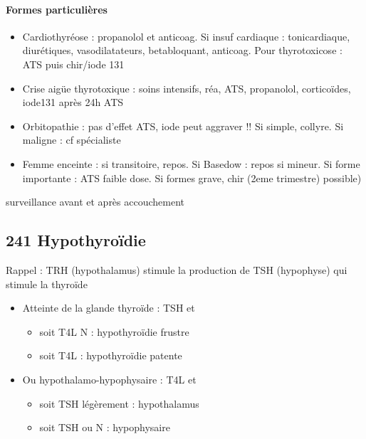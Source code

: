 \documentclass[11pt]{article}
\begin{document}
\paragraph{Formes particulières}
\label{sec:org398e54f}
\begin{itemize}
\item Cardiothyréose : propanolol et anticoag. Si insuf cardiaque : tonicardiaque,
diurétiques, vasodilatateurs, betabloquant, anticoag. Pour thyrotoxicose : ATS
puis chir/iode 131
\item Crise aigüe thyrotoxique : soins intensifs, réa, ATS, propanolol, corticoïdes,
iode131 après 24h ATS
\item Orbitopathie : pas d'effet ATS, iode peut aggraver !! Si simple, collyre. Si maligne : cf spécialiste
\item Femme enceinte : si transitoire, repos. Si Basedow : repos si mineur. Si forme
importante : ATS faible dose. Si formes grave, chir (2eme trimestre) possible)
\end{itemize}
\thus surveillance avant et après accouchement  

\subsection{241 \textdagger{} Hypothyroïdie}
\label{sec:orgc254509}
\begin{tcolorbox}
Rappel : TRH (hypothalamus) stimule la production de TSH (hypophyse) qui stimule la thyroïde
\end{tcolorbox}

\begin{itemize}
\item Atteinte de la glande thyroïde  : \inc TSH et 
\begin{itemize}
\item soit T4L N : hypothyroïdie frustre
\item soit T4L \dec : hypothyroïdie patente
\end{itemize}
\item Ou hypothalamo-hypophysaire : T4L \dec et 
\begin{itemize}
\item soit TSH légèrement \inc : hypothalamus
\item soit TSH \dec ou N : hypophysaire
\end{itemize}
\end{itemize}
\end{document}
